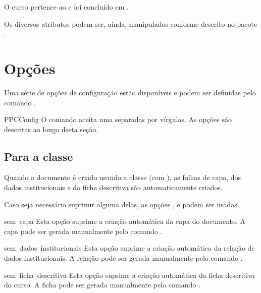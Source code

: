\documentclass[a4paper, 11pt]{article}
\begin{document}
\begin{PDExample}
    O curso pertence ao  e foi concluído em .
\end{PDExample}

Os diversos atributos podem ser, ainda, manipulados conforme descrito no pacote .


\section{Opções}
Uma série de opções de configuração estão disponíveis e podem ser definidas pelo comando .

\begin{Macrodef}{PPCConfig}{}{}
    O comando  aceita uma  separadas por vírgulas. As opções são descritas ao longo desta seção.
\end{Macrodef}

\subsection{Para a classe }
Quando o documento é criado usando a classe  (com ), as folhas de capa, dos dados institucionais e da ficha descritiva são automaticamente criados.

Caso seja necessário suprimir alguma delas, as opções ,  e  podem ser usadas.

\begin{Optiondef}{sem~capa}{}{}
    Esta opção suprime a criação automática da capa do documento. A capa pode ser gerada manualmente pelo comando .
\end{Optiondef}

\begin{Optiondef}{sem~dados~institucionais}{}{}
    Esta opção suprime a criação automática da relação de dados institucionais. A relação pode ser gerada manualmente pelo comando .
\end{Optiondef}

\begin{Optiondef}{sem~ficha~descritiva}{}{}
    Esta opção suprime a criação automática da ficha descritiva do curso. A ficha pode ser gerada manualmente pelo comando .
\end{Optiondef}
\end{document}

